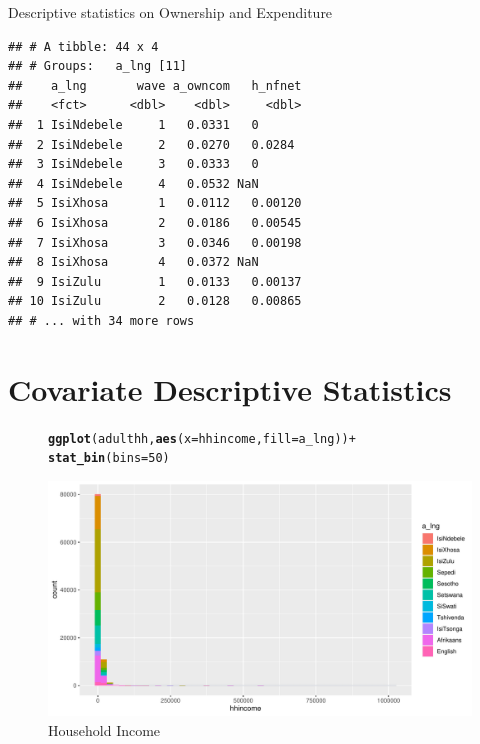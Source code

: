\documentclass[a4paper,british]{article}\usepackage[]{graphicx}\usepackage[]{xcolor}
\makeatletter
\def\maxwidth{ %
  \ifdim\Gin@nat@width>\linewidth
    \linewidth
  \else
    \Gin@nat@width
  \fi
}
\newcommand{\hlnum}[1]{\textcolor[rgb]{0.686,0.059,0.569}{#1}}%
\newcommand{\hlopt}[1]{\textcolor[rgb]{0,0,0}{#1}}%
\newcommand{\hlstd}[1]{\textcolor[rgb]{0.345,0.345,0.345}{#1}}%
\newcommand{\hlkwc}[1]{\textcolor[rgb]{0.333,0.667,0.333}{#1}}%
\newcommand{\hlkwd}[1]{\textcolor[rgb]{0.737,0.353,0.396}{\textbf{#1}}}%
\newenvironment{kframe}{%
 \def\at@end@of@kframe{}%
 \ifinner\ifhmode%
  \def\at@end@of@kframe{\end{minipage}}%
  \begin{minipage}{\columnwidth}%
 \fi\fi%
 \def\FrameCommand##1{\hskip\@totalleftmargin \hskip-\fboxsep
 \colorbox{shadecolor}{##1}\hskip-\fboxsep
     \hskip-\linewidth \hskip-\@totalleftmargin \hskip\columnwidth}%
 \MakeFramed {\advance\hsize-\width
   \@totalleftmargin\z@ \linewidth\hsize
   \@setminipage}}%
 {\par\unskip\endMakeFramed%
 \at@end@of@kframe}
\newenvironment{knitrout}{}{} %
\makeatother
\begin{document}
\begin{table}[H]
\caption{Descriptive statistics on Ownership and Expenditure}
\label{tab:dep_vars}
\centering{}
\begin{knitrout}
\color{fgcolor}\begin{kframe}
\begin{verbatim}
## # A tibble: 44 x 4
## # Groups:   a_lng [11]
##    a_lng       wave a_owncom   h_nfnet
##    <fct>      <dbl>    <dbl>     <dbl>
##  1 IsiNdebele     1   0.0331   0      
##  2 IsiNdebele     2   0.0270   0.0284 
##  3 IsiNdebele     3   0.0333   0      
##  4 IsiNdebele     4   0.0532 NaN      
##  5 IsiXhosa       1   0.0112   0.00120
##  6 IsiXhosa       2   0.0186   0.00545
##  7 IsiXhosa       3   0.0346   0.00198
##  8 IsiXhosa       4   0.0372 NaN      
##  9 IsiZulu        1   0.0133   0.00137
## 10 IsiZulu        2   0.0128   0.00865
## # ... with 34 more rows
\end{verbatim}
\end{kframe}
\end{knitrout}
\end{table}


\section{Covariate Descriptive Statistics}

\begin{figure}[H]
\caption{Household Income}

\label{fig:hhincome}

\begin{knitrout}
\color{fgcolor}\begin{kframe}
\begin{alltt}
\hlkwd{ggplot}\hlstd{(adulthh,} \hlkwd{aes}\hlstd{(}\hlkwc{x}\hlstd{=hhincome,} \hlkwc{fill}\hlstd{=a_lng ))} \hlopt{+}
    \hlkwd{stat_bin}\hlstd{(}\hlkwc{bins}\hlstd{=}\hlnum{50}\hlstd{)}
\end{alltt}
\end{kframe}
\includegraphics[width=\maxwidth]{../misc/latex-hhincome-1} 
\end{knitrout}
\end{figure}
\end{document}
